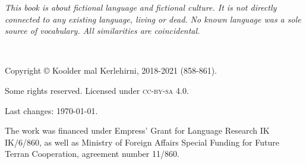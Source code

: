 \emph{This book is about fictional language and fictional culture. It is not
directly connected to any existing language, living or dead. No known language
was a sole source of vocabulary. All similarities are coincidental.}

~\vfill

\begingroup
\setlength\parindent{0pt}\footnotesize
Copyright © Koolder mal Kerlehirni, 2018-2021 (858-861).

\bigskip

Some rights reserved. Licensed under \textsc{cc-by-sa} 4.0.

Last changes: \today{}.

\medskip

The work was financed under Empress' Grant for Language Research IK IK/6/860,
as well as Ministry of Foreign Affairs Special Funding for Future Terran
Cooperation, agreement number 11/860.

\endgroup